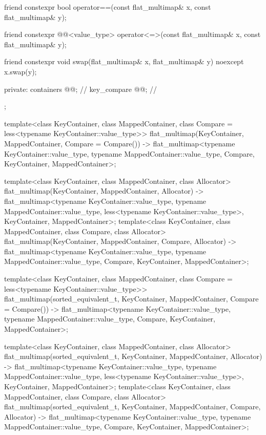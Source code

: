 \begin{codeblock}
{{    friend constexpr bool operator==(const flat_multimap& x, const flat_multimap& y);

    friend constexpr @@<value_type>
      operator<=>(const flat_multimap& x, const flat_multimap& y);

    friend constexpr void swap(flat_multimap& x, flat_multimap& y) noexcept
      { x.swap(y); }

  private:
    containers @@;               // \expos
    key_compare @@;        // \expos
  };

  template<class KeyContainer, class MappedContainer,
           class Compare = less<typename KeyContainer::value_type>>
    flat_multimap(KeyContainer, MappedContainer, Compare = Compare())
      -> flat_multimap<typename KeyContainer::value_type, typename MappedContainer::value_type,
                       Compare, KeyContainer, MappedContainer>;

  template<class KeyContainer, class MappedContainer, class Allocator>
    flat_multimap(KeyContainer, MappedContainer, Allocator)
      -> flat_multimap<typename KeyContainer::value_type, typename MappedContainer::value_type,
                       less<typename KeyContainer::value_type>, KeyContainer, MappedContainer>;
  template<class KeyContainer, class MappedContainer, class Compare, class Allocator>
    flat_multimap(KeyContainer, MappedContainer, Compare, Allocator)
      -> flat_multimap<typename KeyContainer::value_type, typename MappedContainer::value_type,
                       Compare, KeyContainer, MappedContainer>;

  template<class KeyContainer, class MappedContainer,
           class Compare = less<typename KeyContainer::value_type>>
    flat_multimap(sorted_equivalent_t, KeyContainer, MappedContainer, Compare = Compare())
      -> flat_multimap<typename KeyContainer::value_type, typename MappedContainer::value_type,
                       Compare, KeyContainer, MappedContainer>;

  template<class KeyContainer, class MappedContainer, class Allocator>
    flat_multimap(sorted_equivalent_t, KeyContainer, MappedContainer, Allocator)
      -> flat_multimap<typename KeyContainer::value_type, typename MappedContainer::value_type,
                       less<typename KeyContainer::value_type>, KeyContainer, MappedContainer>;
  template<class KeyContainer, class MappedContainer, class Compare, class Allocator>
    flat_multimap(sorted_equivalent_t, KeyContainer, MappedContainer, Compare, Allocator)
      -> flat_multimap<typename KeyContainer::value_type, typename MappedContainer::value_type,
                       Compare, KeyContainer, MappedContainer>;

}
\end{codeblock}
